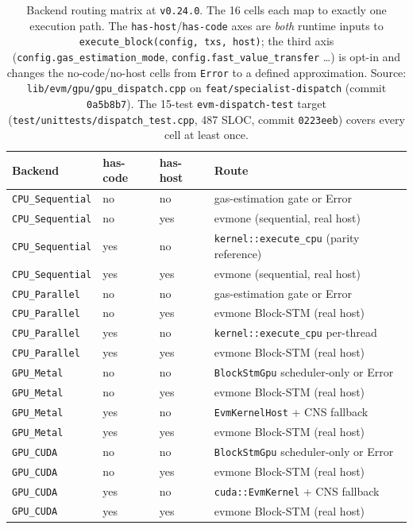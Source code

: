 \begin{table}[h]
\centering
\small
\begin{tabular}{llll}
\toprule
\textbf{Backend} & \textbf{has-code} & \textbf{has-host} & \textbf{Route} \\
\midrule
\texttt{CPU\_Sequential} & no  & no   & gas-estimation gate or Error \\
\texttt{CPU\_Sequential} & no  & yes  & evmone (sequential, real host) \\
\texttt{CPU\_Sequential} & yes & no   & \texttt{kernel::execute\_cpu} (parity reference) \\
\texttt{CPU\_Sequential} & yes & yes  & evmone (sequential, real host) \\
\midrule
\texttt{CPU\_Parallel}   & no  & no   & gas-estimation gate or Error \\
\texttt{CPU\_Parallel}   & no  & yes  & evmone Block-STM (real host) \\
\texttt{CPU\_Parallel}   & yes & no   & \texttt{kernel::execute\_cpu} per-thread \\
\texttt{CPU\_Parallel}   & yes & yes  & evmone Block-STM (real host) \\
\midrule
\texttt{GPU\_Metal}      & no  & no   & \texttt{BlockStmGpu} scheduler-only or Error \\
\texttt{GPU\_Metal}      & no  & yes  & evmone Block-STM (real host) \\
\texttt{GPU\_Metal}      & yes & no   & \texttt{EvmKernelHost} + CNS fallback \\
\texttt{GPU\_Metal}      & yes & yes  & evmone Block-STM (real host) \\
\midrule
\texttt{GPU\_CUDA}       & no  & no   & \texttt{BlockStmGpu} scheduler-only or Error \\
\texttt{GPU\_CUDA}       & no  & yes  & evmone Block-STM (real host) \\
\texttt{GPU\_CUDA}       & yes & no   & \texttt{cuda::EvmKernel} + CNS fallback \\
\texttt{GPU\_CUDA}       & yes & yes  & evmone Block-STM (real host) \\
\bottomrule
\end{tabular}
\caption{Backend routing matrix at \texttt{v0.24.0}. The 16 cells
each map to exactly one execution path. The
\texttt{has-host}/\texttt{has-code} axes are \emph{both} runtime
inputs to \texttt{execute\_block(config, txs, host)}; the third axis
(\texttt{config.gas\_estimation\_mode}, \texttt{config.fast\_value\_transfer}
\ldots) is opt-in and changes the no-code/no-host cells from \texttt{Error}
to a defined approximation. Source: \texttt{lib/evm/gpu/gpu\_dispatch.cpp}
on \texttt{feat/specialist-dispatch} (commit \texttt{0a5b8b7}). The
15-test \texttt{evm-dispatch-test} target
(\texttt{test/unittests/dispatch\_test.cpp}, 487 SLOC, commit
\texttt{0223eeb}) covers every cell at least once.}
\label{tab:v024-routing}
\end{table}

